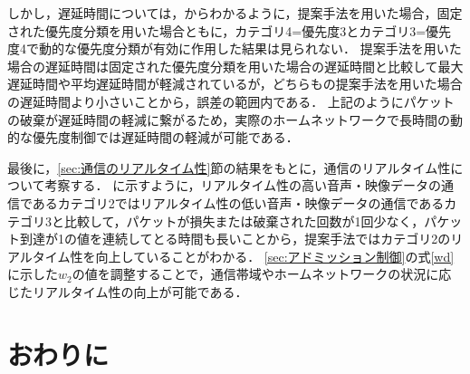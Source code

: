 \documentclass[a4paper,11pt,uplatex]{ujreport}
\begin{document}
  しかし，遅延時間については，からわかるように，提案手法を用いた場合，固定された優先度分類を用いた場合ともに，カテゴリ4=優先度3とカテゴリ3=優先度4で動的な優先度分類が有効に作用した結果は見られない．
  提案手法を用いた場合の遅延時間は固定された優先度分類を用いた場合の遅延時間と比較して最大遅延時間や平均遅延時間が軽減されているが，どちらもの提案手法を用いた場合の遅延時間より小さいことから，誤差の範囲内である．
  上記のようにパケットの破棄が遅延時間の軽減に繋がるため，実際のホームネットワークで長時間の動的な優先度制御では遅延時間の軽減が可能である．\par

  最後に，\ref{sec:通信のリアルタイム性}節の結果をもとに，通信のリアルタイム性について考察する．
  に示すように，リアルタイム性の高い音声・映像データの通信であるカテゴリ2ではリアルタイム性の低い音声・映像データの通信であるカテゴリ3と比較して，パケットが損失または破棄された回数が1回少なく，パケット到達が1の値を連続してとる時間も長いことから，提案手法ではカテゴリ2のリアルタイム性を向上していることがわかる．
  \ref{sec:アドミッション制御}の式\ref{wd}に示した$w_2$の値を調整することで，通信帯域やホームネットワークの状況に応じたリアルタイム性の向上が可能である．

\chapter{おわりに}
\label{chap:おわりに}

\end{document}
